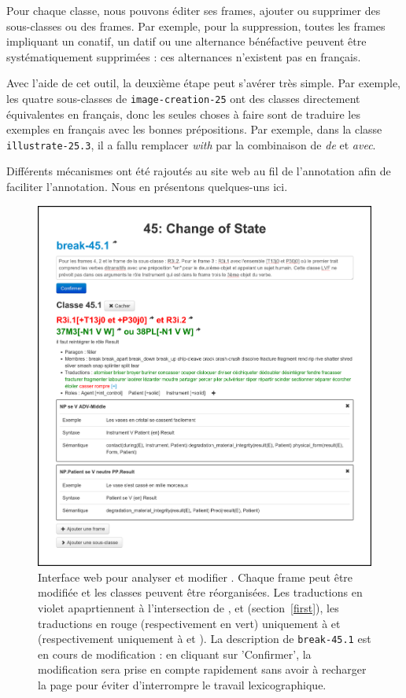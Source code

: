 Pour chaque classe, nous pouvons éditer ses frames, ajouter ou supprimer des
sous-classes ou des frames. Par exemple, pour la suppression, toutes les
frames impliquant un conatif, un datif ou une alternance bénéfactive peuvent
être systématiquement supprimées : ces alternances n'existent pas en français.

Avec l'aide de cet outil, la deuxième étape peut s'avérer très simple. Par
exemple, les quatre sous-classes de {\color{blue}\texttt{image-creation-25}}
ont des classes directement équivalentes en français, donc les seules choses à
faire sont de traduire les exemples en français avec les bonnes prépositions.
Par exemple, dans la classe {\color{blue}\texttt{illustrate-25.3}}, il a fallu
remplacer \textit{with} par la combinaison de \textit{de} et \textit{avec}.

Différents mécanismes ont été rajoutés au site web au fil de l'annotation afin
de faciliter l'annotation. Nous en présentons quelques-uns ici.

\begin{figure}[p]

    \includegraphics[width=\textwidth]{fig/tool_screenshot_2014-09-12.png}

    \caption{\label{tool}Interface web pour analyser et modifier \verbenet{}.
        Chaque frame peut être modifiée et les classes peuvent être
        réorganisées. Les traductions en violet apaprtiennent à l'intersection
        de \Clvf{}, \Clg{} et \Ltrad{} (section~\ref{first}), les traductions
        en rouge (respectivement en vert) uniquement à \Clvf{} et \Ltrad
        (respectivement uniquement à \Clg{} et \Ltrad{}). La description de
        {\color{blue}\texttt{break-45.1}} est en cours de modification : en cliquant sur
        'Confirmer', la modification sera prise en compte rapidement sans avoir
    à recharger la page pour éviter d'interrompre le travail lexicographique.}
\end{figure}


